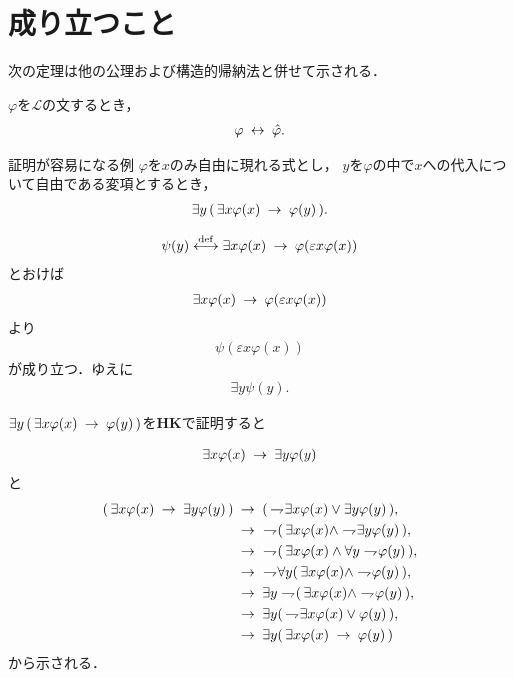 \section{成り立つこと}
	次の定理は他の公理および構造的帰納法と併せて示される．
	
	\begin{screen}
		\begin{thm}[書き換えの同値性]
			$\varphi$を$\mathcal{L}$の文するとき，
			\begin{align}
				\varphi \hspace{0.25em}\leftrightarrow\hspace{0.25em} \hat{\varphi}.
			\end{align}
		\end{thm}
	\end{screen}
	
\newpage
	\begin{itembox}[l]{証明が容易になる例}
		$\varphi$を$x$のみ自由に現れる式とし，
		$y$を$\varphi$の中で$x$への代入について自由である変項とするとき，
		\begin{align}
			\exists y\, (\, \exists x \varphi(x) \hspace{0.25em}\rightarrow\hspace{0.25em} \varphi(y)\, ).
		\end{align}
	\end{itembox}
	
	\begin{sketch}
		\begin{align}
			\psi(y) \overset{\mathrm{def}}{\longleftrightarrow} \exists x \varphi(x) \hspace{0.25em}\rightarrow\hspace{0.25em} \varphi(\varepsilon x \varphi(x))
		\end{align}
		とおけば
		\begin{align}
			\exists x \varphi(x) \hspace{0.25em}\rightarrow\hspace{0.25em} \varphi(\varepsilon x \varphi(x))
		\end{align}
		より
		\begin{align}
			\psi(\varepsilon x \varphi(x))
		\end{align}
		が成り立つ．ゆえに
		\begin{align}
			\exists y \psi(y).
		\end{align}
	\end{sketch}

\newpage
	$\exists y\, (\, \exists x \varphi(x) \hspace{0.25em}\rightarrow\hspace{0.25em} \varphi(y)\, )$を{\bf HK}で証明すると
	
	\begin{align}
		\exists x \varphi(x) \hspace{0.25em}\rightarrow\hspace{0.25em} \exists y \varphi(y)
	\end{align}
	と
	\begin{align}
		(\, \exists x \varphi(x) \rarrow \exists y \varphi(y) \, )
		&\rarrow (\, \negation \exists x \varphi(x) \vee \exists y \varphi(y) \, ), \\
		&\rarrow\ \negation (\, \exists x \varphi(x) \wedge \negation \exists y \varphi(y) \, ), \\
		&\rarrow\ \negation (\, \exists x \varphi(x) \wedge \forall y \negation \varphi(y) \, ), \\
		&\rarrow\ \negation \forall y (\, \exists x \varphi(x) \wedge \negation \varphi(y) \, ), \\
		&\rarrow \exists y \negation (\, \exists x \varphi(x) \wedge \negation \varphi(y) \, ), \\
		&\rarrow \exists y (\, \negation \exists x \varphi(x) \vee \varphi(y) \, ), \\
		&\rarrow \exists y (\, \exists x \varphi(x) \rarrow \varphi(y) \, )
	\end{align}
	から示される．